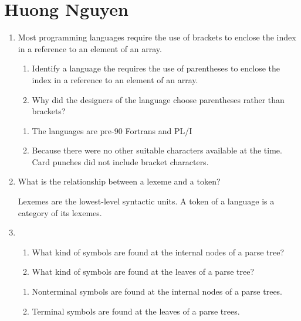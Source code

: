 
\chapter{Huong Nguyen}

\begin{enumerate}
  \item Most programming languages require the use of brackets to
    enclose the index in a reference to an element of an array.
  \begin{enumerate}
    \item Identify a language the requires the use of parentheses
      to enclose the index in a reference to an element of an array.
    \item Why did the designers of the language choose parentheses
      rather than brackets?
    \end{enumerate}

  \begin{answer}

  \begin{enumerate}
    \item The languages are pre-90 Fortrans and PL/I
    \item Because there were no other suitable characters available at the time. Card punches did not include bracket characters.
    \end{enumerate}

    \end{answer}
    
  \item What is the relationship between a lexeme and a token?

  \begin{answer}

    Lexemes are the lowest-level syntactic units. A token of a language is a category of its lexemes.

    \end{answer}

  \item
  \begin{enumerate}
    \item What kind of symbols are found at the internal nodes of a
      parse tree?
    \item What kind of symbols are found at the leaves of a parse tree?
    \end{enumerate}

  \begin{answer}

  \begin{enumerate}
    \item Nonterminal symbols are found at the internal nodes of a parse trees.
    \item Terminal symbols are found at the leaves of a parse trees.
    \end{enumerate}


\end{answer}
\end{enumerate}
